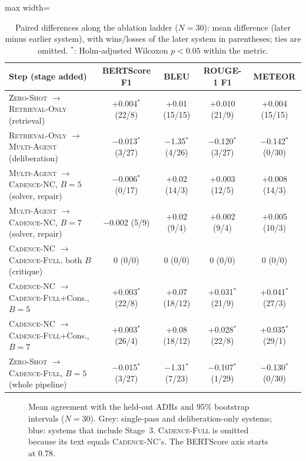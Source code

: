 \documentclass[preprint,12pt,authoryear]{elsarticle}
\newcommand{\sysZS}{\textsc{Zero-Shot}}
\newcommand{\sysRO}{\textsc{Retrieval-Only}}
\newcommand{\sysMA}{\textsc{Multi-Agent}}
\newcommand{\sysNC}{\textsc{Cadence-NC}}
\newcommand{\sysFull}{\textsc{Cadence-Full}}
\renewcommand{\_}{\textunderscore\allowbreak{}}
\begin{document}
\begin{table}[!htbp]
\caption{Paired differences along the ablation ladder ($N=30$): mean difference (later minus earlier system), with wins/losses of the later system in parentheses; ties are omitted. $^{*}$: Holm-adjusted Wilcoxon $p<0.05$ within the metric.\label{tab:rq1-paired}}
\centering
\begin{adjustbox}{max width=\textwidth}
\begin{tabular}{@{}lcccc@{}}
\toprule
Step (stage added) & BERTScore F1 & BLEU & ROUGE-1 F1 & METEOR \\
\midrule
\sysZS{} $\to$ \sysRO{} (retrieval) & +0.004$^{*}$ (22/8) & +0.01 (15/15) & +0.010 (21/9) & +0.004 (15/15) \\
\sysRO{} $\to$ \sysMA{} (deliberation) & $-$0.013$^{*}$ (3/27) & $-$1.35$^{*}$ (4/26) & $-$0.120$^{*}$ (3/27) & $-$0.142$^{*}$ (0/30) \\
\sysMA{} $\to$ \sysNC{}, $B=5$ (solver, repair) & $-$0.006$^{*}$ (0/17) & +0.02 (14/3) & +0.003 (12/5) & +0.008 (14/3) \\
\sysMA{} $\to$ \sysNC{}, $B=7$ (solver, repair) & $-$0.002 (5/9) & +0.02 (9/4) & +0.002 (9/4) & +0.005 (10/3) \\
\sysNC{} $\to$ \sysFull{}, both $B$ (critique) & 0 (0/0) & 0 (0/0) & 0 (0/0) & 0 (0/0) \\
\sysNC{} $\to$ \sysFull{}+Cons., $B=5$ & +0.003$^{*}$ (22/8) & +0.07 (18/12) & +0.031$^{*}$ (21/9) & +0.041$^{*}$ (27/3) \\
\sysNC{} $\to$ \sysFull{}+Cons., $B=7$ & +0.003$^{*}$ (26/4) & +0.08 (18/12) & +0.028$^{*}$ (22/8) & +0.035$^{*}$ (29/1) \\
\midrule
\sysZS{} $\to$ \sysFull{}, $B=5$ (whole pipeline) & $-$0.015$^{*}$ (3/27) & $-$1.31$^{*}$ (7/23) & $-$0.107$^{*}$ (1/29) & $-$0.130$^{*}$ (0/30) \\
\bottomrule
\end{tabular}
\end{adjustbox}
\end{table}

\begin{figure}[!htbp]
\centering
{}
\caption{Mean agreement with the held-out ADRs and 95\% bootstrap intervals ($N=30$). Grey: single-pass and deliberation-only systems; blue: systems that include Stage~3. \sysFull{} is omitted because its text equals \sysNC{}'s. The BERTScore axis starts at 0.78.\label{fig:results}}
\end{figure}
\FloatBarrier
\end{document}
